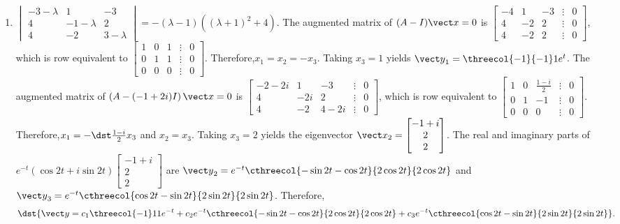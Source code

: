 \documentclass[openany]{book}
\newenvironment{sectionSolutions}{
 \begin{enumerate}[item-label={\thesection.\arabic{enumi}.}]
}{
 \end{enumerate}
}
\begin{document}
\begin{sectionSolutions}
\item
$\begin{vmatrix}-3-\lambda&1&-3\\4&-1-\lambda&2\\4
&-2&3-\lambda\end{vmatrix}=-(\lambda-1)\left((\lambda+1)^2+4\right)$.
 The augmented matrix of $(A-I){\vect x=0}$ is
$\begin{bmatrix}-4&1&-3&\vdots&0\\4&-2&2&\vdots&0\\
4&-2&2&\vdots&0\end{bmatrix}$,
which is row equivalent to
$\begin{bmatrix} 1&0&1&\vdots&0\\ 0&1&1&
\vdots&0\\ 0&0&0&\vdots&0\end{bmatrix}$.
Therefore,$x_1=x_2=-x_3$.  Taking $x_3=1$ yields
${\vect y}_1=\threecol{-1}{-1}1e^t$. The augmented matrix of
$\left(A-(-1+2i)I\right){\vect x=0}$ is
$\begin{bmatrix}-2-2i&1&-3&\vdots&0\\4&-2i&2&\vdots&0\\
4&-2&4-2i&\vdots&0\end{bmatrix}$,
which is row equivalent to
$\begin{bmatrix} 1&0&\frac{1-i}{2}&\vdots&0\\
0&1&-1&\vdots&0\\ 0&0&0&\vdots&0\end{bmatrix}$.
Therefore,$x_1=-\dst\frac{1-i}{2}x_3$ and $x_2=x_3$.
Taking $x_3=2$ yields the eigenvector
${\vect x}_2=\begin{bmatrix}-1+i\\2\\2\end{bmatrix}$.
The real and imaginary parts of
$e^{-t}(\cos2t+i\sin2t)\begin{bmatrix}-1+i\\2\\2\end{bmatrix}$
are ${\vect y}_2=e^{-t}\cthreecol{-\sin2t-\cos2t}{2\cos2t}{2\cos2t}$
and ${\vect y}_3=e^{-t}\cthreecol {\cos2t-\sin2t}{2\sin2t}{2\sin2t}$.
Therefore,
\[
\dst{{\vect
y}=c_1\threecol{-1}11e^{-t}+c_2e^{-t}\cthreecol{-\sin
2t-\cos2t}{2\cos2t}{2\cos2t}+c_3e^{-t}\cthreecol
{\cos2t-\sin2t}{2\sin2t}{2\sin2t}}.
\]



\end{sectionSolutions}
\end{document}
